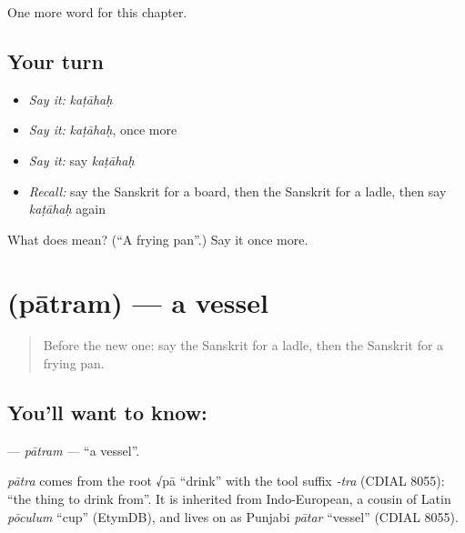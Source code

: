 \begin{grammarlens}[title={What you've built}]
One more word for this chapter.
\end{grammarlens}

\subsection*{Your turn}
\begin{itemize}
\raggedright
  \item \emph{Say it:} \emph{kaṭāhaḥ}
  \item \emph{Say it:} \emph{kaṭāhaḥ}, once more
  \item \emph{Say it:} say \emph{kaṭāhaḥ}
  \item \emph{Recall:} say the Sanskrit for a board, then the Sanskrit for a ladle, then say \emph{kaṭāhaḥ} again
\end{itemize}

\begin{tcolorbox}[breakable,colback=teal!4,colframe=teal!35!black,title={Before you move on}]
What does  mean? (\textquotedblleft{}A frying pan\textquotedblright{}.) Say it once more.
\end{tcolorbox}
\section[\texorpdfstring{\sk{पात्रम्} (pātram)}{पात्रम् (pātram)}]{ (pātram) — a vessel}

\label{lesson:SA-C119-patram}



\begin{quote}
Before the new one: say the Sanskrit for a ladle, then the Sanskrit for a frying pan.
\end{quote}

\subsection*{You'll want to know: }
\textbf{} — \emph{pātram} — \textquotedblleft{}a vessel\textquotedblright{}.

\begin{cousinweb}
\emph{pātra} comes from the root √pā \textquotedblleft{}drink\textquotedblright{} with the tool suffix \emph{-tra} (CDIAL 8055): \textquotedblleft{}the thing to drink from\textquotedblright{}. It is inherited from Indo-European, a cousin of Latin \emph{pōculum} \textquotedblleft{}cup\textquotedblright{} (EtymDB), and lives on as Punjabi \emph{pātar} \textquotedblleft{}vessel\textquotedblright{} (CDIAL 8055).
\end{cousinweb}

